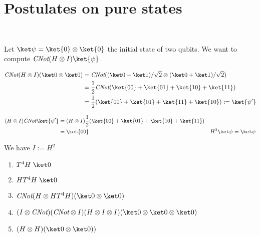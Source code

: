 \section{Postulates on pure states}

\exo[Evolutions]~

Let $\ket \psi = \ket{0} \otimes \ket{0}$ the initial state of two
qubits. We want to compute $\textit{CNot} (H \otimes I) \ket{\psi}$.

\begin{align*}
  \CNot (H \otimes I) (\ket 0 \otimes \ket 0) &=
    \CNot ((\ket 0 + \ket 1)/\sqrt 2 \otimes (\ket 0 + \ket 1)/\sqrt 2) \\
    &= \frac 1 2 \CNot (\ket{00} + \ket{01} + \ket{10} + \ket{11}) \\
    &= \frac 1 2 (\ket{00} + \ket{01} + \ket{11} + \ket{10}) := \ket{\psi'}
\end{align*}

\begin{align*}
  (H\otimes I)\CNot \ket{\psi'}
  &= (H\otimes I) \frac 1 2 (\ket{00} + \ket{01} + \ket{10} + \ket{11}) \\
  &= \ket {00} & H^2\ket \psi = \ket \psi
\end{align*}

We have $I := H^2$

\begin{enumerate}
  \item $T^4H\; \ket 0$
  \item $HT^4H\; \ket 0$
  \item $\CNot(H \otimes HT^4H)(\ket 0 \otimes \ket 0)$
  \item $(I \otimes \CNot)(\CNot \otimes I)(H \otimes I \otimes I)
    (\ket 0 \otimes \ket 0 \otimes \ket 0)$
  \item $(H \otimes H) (\ket 0 \otimes \ket 0))$
\end{enumerate}

~

